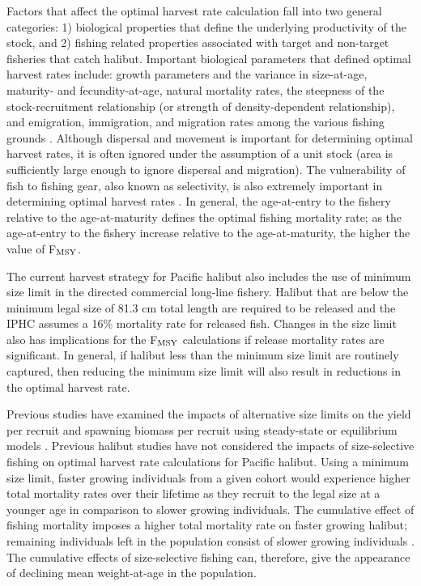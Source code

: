 Factors that affect the optimal harvest rate calculation fall into two general categories: 1) biological properties that define the underlying productivity of the stock, and 2) fishing related properties associated with target and non-target fisheries that catch halibut.  Important biological parameters that defined optimal harvest rates include: growth parameters and the variance in size-at-age, maturity- and fecundity-at-age, natural mortality rates, the steepness of the stock-recruitment relationship (or strength of density-dependent relationship), and emigration, immigration, and migration rates among the various fishing grounds \citep{Beddington2005}. Although  dispersal and movement is important for determining optimal harvest rates, it is often ignored under the assumption of a unit stock (area is sufficiently large enough to ignore dispersal and migration). The vulnerability of fish to fishing gear, also known as selectivity, is also extremely important in determining optimal harvest rates \citep{hilborn1992quantitative}.  In general, the age-at-entry to the fishery relative to the age-at-maturity defines the optimal fishing mortality rate; as the age-at-entry to the fishery increase relative to the age-at-maturity, the higher the value of F$_{\rm{MSY}}$.


The current harvest strategy for Pacific halibut also includes the use of minimum size limit in the directed commercial long-line fishery. Halibut that are below the minimum legal size of 81.3 cm total length are required to be released and the IPHC assumes a 16\% mortality rate for released fish.  Changes in the size limit also has implications for the F$_{\rm{MSY}}$ calculations if release mortality rates are significant. In general, if halibut less than the minimum size limit are routinely captured, then reducing the minimum size limit will also result in reductions in the optimal harvest rate.

Previous studies have examined the impacts of alternative size limits on the yield per recruit and spawning biomass per recruit using steady-state or equilibrium models \citep{clark1995re}.  Previous halibut studies have not considered the impacts of size-selective fishing on optimal harvest rate calculations for Pacific halibut.  Using a minimum size limit, faster growing individuals from a given cohort would experience higher total mortality rates over their lifetime as they recruit to the legal size at a younger age in comparison to slower growing individuals. The cumulative effect of fishing mortality imposes a higher total mortality rate on faster growing halibut; remaining individuals left in the population consist of slower growing individuals \citep{Taylor2005}.  The cumulative effects of size-selective fishing can, therefore, give the appearance of declining mean weight-at-age in the population.

